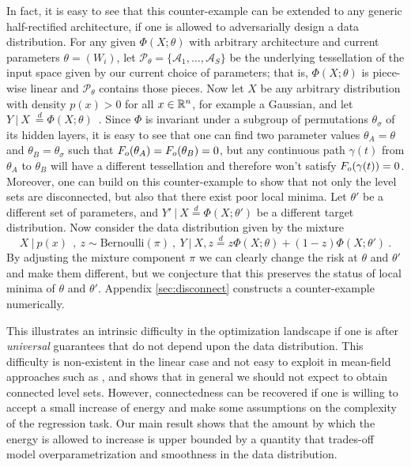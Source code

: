 In fact, it is easy to see that this counter-example can be extended to any generic half-rectified architecture, if one is 
allowed to adversarially design a data distribution. For any given $\Phi(X; \theta)$ with arbitrary architecture and current parameters 
$\theta = (W_i)$, let $\mathcal{P}_\theta=\{ \mathcal{A}_1, \dots, \mathcal{A}_S\}$ be the underlying tessellation of the input space given by our current choice of parameters; that is, $\Phi(X; \theta)$ is piece-wise linear and $\mathcal{P}_\theta$ contains those pieces. Now let 
$X$ be any arbitrary distribution with density $p(x) > 0$ for all $x \in {\mathbb{R}}^n$, for example a Gaussian, and let %
$Y ~|~X ~\stackrel{d}{=} \Phi(X ; \theta)$~. Since $\Phi$ is invariant under a subgroup of permutations $\theta_\sigma$ of its hidden layers, it is easy to see that one can find two parameter values $\theta_A = \theta$ and $\theta_B = \theta_\sigma$ such that $F_{o}(\theta_A) = F_{o}(\theta_B) = 0$, but any continuous path $\gamma(t)$ from $\theta_A$ to $\theta_B$ will have a different tessellation and therefore won't satisfy $F_{o}( \gamma(t) ) = 0$. 
Moreover, one can build on this counter-example to show that not only the level sets are disconnected, but also that there exist poor local minima. Let $\theta'$ be a different set of parameters, and $Y' ~|~X \stackrel{d}{=} \Phi(X; \theta')$ be a different target distribution. Now consider the data distribution given by the mixture
$$X ~|~p(x) ~~,~z \sim \text{Bernoulli}(\pi)~,~Y ~|~X,z \stackrel{d}{=} z \Phi(X;\theta) + (1-z) \Phi(X; \theta')~.$$
By adjusting the mixture component $\pi$ we can clearly change the risk at $\theta$ and $\theta'$ and make them different, but we conjecture that this preserves the status of local minima of $\theta$ and $\theta'$. Appendix \ref{sec:disconnect} constructs a counter-example numerically.
 
This illustrates an intrinsic difficulty in the optimization landscape if one is after \emph{universal} 
guarantees that do not depend upon the data distribution. This difficulty is non-existent in the linear case 
and not easy to exploit in mean-field approaches such as \cite{choromanska2015loss}, 
and shows that in general 
we should not expect to obtain connected level sets. However, 
connectedness can be recovered if one is willing to accept a small increase 
of energy and make some assumptions on the complexity of the regression task.
 Our main result shows that the amount by which the energy is 
allowed to increase is upper bounded by a quantity that trades-off model overparametrization 
and smoothness in the data distribution.

